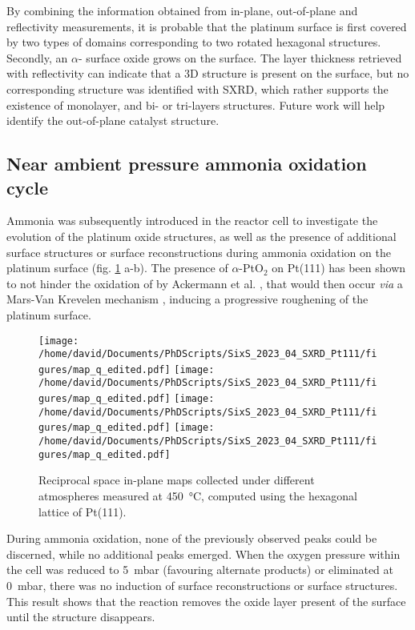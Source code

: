 By combining the information obtained from in-plane, out-of-plane and reflectivity measurements, it is probable that the platinum surface is first covered by two types of domains corresponding to two rotated hexagonal structures.
Secondly, an $\alpha$- surface oxide grows on the surface.
The layer thickness retrieved with reflectivity can indicate that a 3D structure is present on the surface, but no corresponding structure was identified with SXRD, which rather supports the existence of monolayer, and bi- or tri-layers structures.
Future work will help identify the out-of-plane catalyst structure.

\subsection{Near ambient pressure ammonia oxidation cycle}

Ammonia was subsequently introduced in the reactor cell to investigate the evolution of the platinum oxide structures, as well as the presence of additional surface structures or surface reconstructions during ammonia oxidation on the platinum surface (fig. \ref{fig:MapsPt111B} a-b).
The presence of $\alpha$-PtO$_2$ on Pt(111) has been shown to not hinder the oxidation of  by Ackermann et al. \parencite*{Ackermann2007}, that would then occur \textit{via} a Mars-Van Krevelen mechanism \parencite{Mars1954}, inducing a progressive roughening of the platinum surface.

\begin{figure}[!htb]
    \centering
    \texttt{[image: /home/david/Documents/PhDScripts/SixS\_2023\_04\_SXRD\_Pt111/figures/map\_q\_edited.pdf]}
    \texttt{[image: /home/david/Documents/PhDScripts/SixS\_2023\_04\_SXRD\_Pt111/figures/map\_q\_edited.pdf]}
    \texttt{[image: /home/david/Documents/PhDScripts/SixS\_2023\_04\_SXRD\_Pt111/figures/map\_q\_edited.pdf]}
    \texttt{[image: /home/david/Documents/PhDScripts/SixS\_2023\_04\_SXRD\_Pt111/figures/map\_q\_edited.pdf]}
    \caption{
        Reciprocal space in-plane maps collected under different atmospheres measured at \qty{450}{\degreeCelsius}, computed using the hexagonal lattice of Pt(111).
    }
    \label{fig:MapsPt111B}
\end{figure}

During ammonia oxidation, none of the previously observed peaks could be discerned, while no additional peaks emerged.
When the oxygen pressure within the cell was reduced to \qty{5}{\milli\bar} (favouring alternate products) or eliminated at \qty{0}{\milli\bar}, there was no induction of surface reconstructions or surface structures.
This result shows that the reaction removes the oxide layer present of the surface until the structure disappears.

